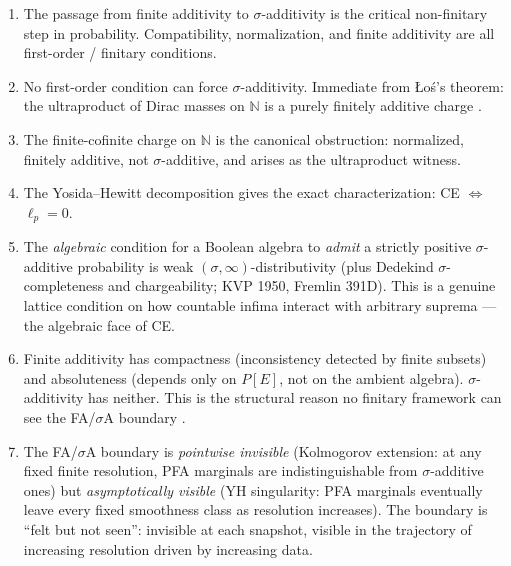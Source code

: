 \begin{enumerate}
  \item The passage from finite additivity to $\sigma$-additivity
    is the critical non-finitary step in probability.
    Compatibility, normalization, and finite additivity are all
    first-order / finitary conditions.

  \item No first-order condition can force $\sigma$-additivity.
    Immediate from \L{}o\'{s}'s theorem: the ultraproduct of
    Dirac masses on $\mathbb{N}$ is a purely finitely additive
    charge \cite{Hoover1978, FaginHalpernMegiddo1990}.

  \item The finite-cofinite charge on $\mathbb{N}$ is the
    canonical obstruction: normalized, finitely additive,
    not $\sigma$-additive, and arises as the ultraproduct witness.

  \item The Yosida--Hewitt decomposition gives the exact
    characterization: CE $\Leftrightarrow$ $\ell_p = 0$.

  \item The \emph{algebraic} condition for a Boolean algebra to
    \emph{admit} a strictly positive $\sigma$-additive probability is
    weak $(\sigma,\infty)$-distributivity (plus Dedekind
    $\sigma$-completeness and chargeability; KVP 1950, Fremlin 391D).
    This is a genuine lattice condition on how countable infima
    interact with arbitrary suprema --- the algebraic face of CE.

  \item Finite additivity has compactness (inconsistency detected
    by finite subsets) and absoluteness (depends only on $P[E]$,
    not on the ambient algebra).  $\sigma$-additivity has neither.
    This is the structural reason no finitary framework can see
    the FA/$\sigma$A boundary \cite{Howson2008}.

  \item The FA/$\sigma$A boundary is \emph{pointwise invisible}
    (Kolmogorov extension: at any fixed finite resolution, PFA
    marginals are indistinguishable from $\sigma$-additive ones)
    but \emph{asymptotically visible} (YH singularity: PFA
    marginals eventually leave every fixed smoothness class as
    resolution increases).  The boundary is ``felt but not seen'':
    invisible at each snapshot, visible in the trajectory of
    increasing resolution driven by increasing data.
\end{enumerate}

